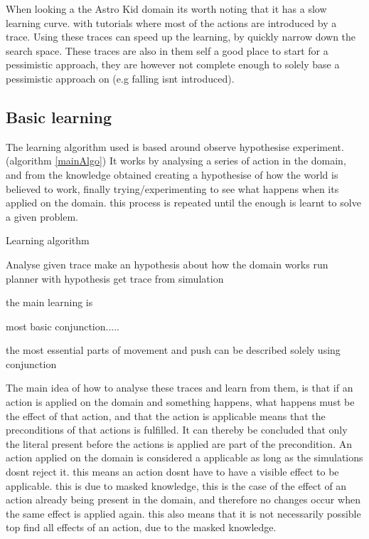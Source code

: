 	
	
	
	When looking a the Astro Kid domain its worth noting that it has a slow learning curve. with tutorials where most of the actions are introduced by a trace. Using these traces can speed up the learning, by quickly narrow down the search space. These traces are also in them self a good place to start for a pessimistic approach, they are however not complete enough to solely base a pessimistic approach on (e.g falling isnt introduced).




\subsection{Basic learning}
	\label{basic}
	The learning algorithm used is based around observe hypothesise experiment. (algorithm \ref{mainAlgo}) It works by analysing a series of action in the domain, and from the knowledge obtained creating a hypothesise of how the world is believed to work, finally trying/experimenting to see what happens when its applied on the domain. this process is repeated until the enough is learnt to solve a given problem.
	
	
	
	
	\begin{algorithm}
		\caption{Learning algorithm}
		\label{mainAlgo}
		\begin{algorithmic}[1]
			\State Analyse given trace
			\State make an hypothesis about how the domain works
			\State run planner with hypothesis
			\State get trace from simulation
			\EndWhile
			
		\end{algorithmic}
	\end{algorithm}	
	
	the main learning is
	
	most basic conjunction.....
	
	the most essential parts of movement and push can be described solely using conjunction


	The main idea of how to analyse these traces and learn from them, is that if an action is applied on the domain and something happens, what happens must be the effect of that action, and that the action is applicable means that the preconditions of that actions is fulfilled. It can thereby be concluded that only the literal present before the actions is applied are part of the precondition. An action applied on the domain is considered a applicable as long as the simulations dosnt reject it. this means an action dosnt have to have a visible effect to be applicable. this is due to masked knowledge, this is the case of the effect of an action already being present in the domain, and therefore no changes occur when the same effect is applied again. this also means that it is not necessarily possible top find all effects of an action, due to the masked knowledge.
	
